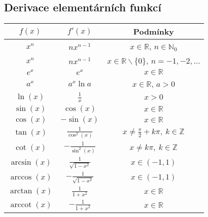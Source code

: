 \noindent\begin{minipage}{\linewidth}
    \subsection*{Derivace elementárních funkcí}

    \centering
    \begin{tabular}{|c|c|c|}
        \hline
        \textbf{\( f(x) \)}            & \textbf{\( f'(x) \)}          & \textbf{Podmínky}                                             \\
        \hline
        \( x^n \)                      & \( nx^{n-1} \)                & \( x\in\mathbb{R} \), \( n \in\mathbb{N}_0 \)                   \\
        \( x^n \)                      & \( nx^{n-1} \)                & \( x\in\mathbb{R}\smallsetminus\{0\} \), \( n = -1,-2,\ldots \) \\
        \( e^x \)                      & \( e^x \)                     & \( x\in\mathbb{R} \)                                            \\
        \( a^x \)                      & \( a^x\ln a \)                & \( x\in\mathbb{R} \), \( a>0 \)                                 \\
        \( \ln(x) \)                   & \( \frac{1}{x} \)             & \( x>0 \)                                                       \\
        \( \sin(x) \)                  & \( \cos(x) \)                 & \( x\in\mathbb{R} \)                                            \\
        \( \cos(x) \)                  & \( -\sin(x) \)                & \( x\in\mathbb{R} \)                                            \\
        \( \tan(x) \)                  & \( \frac{1}{\cos^2(x)} \)     & \( x\neq \frac{\pi}{2} + k\pi, \ k\in\mathbb{Z} \)              \\
        \( \cot(x) \)                  & \( -\frac{1}{\sin^2(x)} \)    & \( x\neq k\pi, \ k\in\mathbb{Z} \)                              \\
        \( \arcsin(x) \)               & \( \frac{1}{\sqrt{1-x^2}} \)  & \( x\in(-1,1) \)                                                \\
        \( \arccos(x) \)               & \( -\frac{1}{\sqrt{1-x^2}} \) & \( x\in(-1,1) \)                                                \\
        \( \arctan(x) \)               & \( \frac{1}{1+x^2} \)         & \( x\in\mathbb{R} \)                                            \\
        \( \operatorname{arccot}(x) \) & \( -\frac{1}{1+x^2} \)        & \( x\in\mathbb{R} \)                                            \\
        \hline
    \end{tabular}

\end{minipage}
